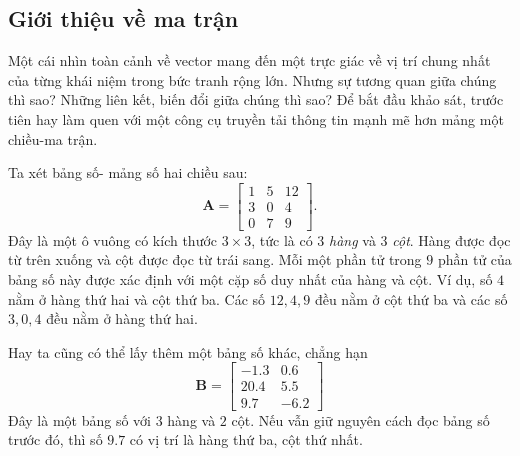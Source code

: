 \subsection{Giới thiệu về ma trận}
Một cái nhìn toàn cảnh về vector mang đến một trực giác về vị trí chung nhất của từng khái niệm trong bức tranh rộng lớn. Nhưng sự tương quan giữa chúng thì sao? Những liên kết, biến đổi giữa chúng thì sao? Để bắt đầu 
khảo sát, trước tiên hay làm quen với một công cụ truyền tải thông tin mạnh mẽ hơn mảng một chiều-ma trận.
\vspace{8pt}

Ta xét bảng số- mảng số hai chiều sau:
\[ \mathbf{A}=
\begin{bmatrix}
    1&5&12\\
    3&0&4\\
    0&7&9
\end{bmatrix}.
\]
Đây là một ô vuông có kích thước \(3\times 3\), tức là có \(3\) \emph{hàng} và \(3\) \emph{cột}. Hàng được đọc từ trên xuống và cột được đọc từ trái sang. Mỗi một phần tử  trong \(9\) phần tử  của bảng số này được xác định với một cặp số duy nhất của hàng và cột. Ví dụ, số \(4\) nằm ở hàng thứ hai và cột thứ ba. 
Các số \(12,4,9\) đều nằm ở cột thứ ba và các số \(3,0,4\) đều nằm ở hàng thứ hai. 

Hay ta cũng có thể lấy thêm một bảng số khác, chẳng hạn
\[\mathbf{B}=\begin{bmatrix}
    -1.3&0.6\\
    20.4&5.5\\
    9.7&-6.2
\end{bmatrix}\] Đây là một bảng số với \(3\) hàng và \(2\) cột. Nếu vẫn giữ nguyên cách đọc bảng số trước đó, thì số \(9.7\) có vị trí là hàng thứ ba, cột thứ nhất. 

